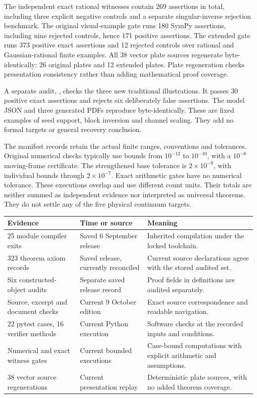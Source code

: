 The independent exact rational witnesses contain 269 assertions in total, including three explicit negative controls and a separate singular-inverse rejection benchmark. The original visual-example gate runs 180 SymPy assertions, including nine rejected controls, hence 171 positive assertions. The extended gate runs 373 positive exact assertions and 12 rejected controls over rational and Gaussian-rational finite examples. All 38 vector plate sources regenerate byte-identically: 26 original plates and 12 extended plates. Plate regeneration checks presentation consistency rather than adding mathematical proof coverage.

A separate audit, , checks the three new traditional illustrations. It passes 30 positive exact assertions and rejects six deliberately false assertions. The model JSON and three generated PDFs reproduce byte-identically. These are fixed examples of seed support, block inversion and channel scaling. They add no formal targets or general recovery conclusion.

The manifest records retain the actual finite ranges, conventions and tolerances. Original numerical checks typically use bounds from $10^{-12}$ to $10^{-10}$, with a $10^{-6}$ moving-frame certificate. The strengthened base tolerance is $2\times10^{-9}$, with individual bounds through $2\times10^{-7}$. Exact arithmetic gates have no numerical tolerance. These executions overlap and use different count units. Their totals are neither summed as independent evidence nor interpreted as universal theorems. They do not settle any of the five physical continuum targets.

\begin{longtable}{@{}p{.31\linewidth}p{.30\linewidth}p{.32\linewidth}@{}}
\toprule Evidence & Time or source & Meaning\\\midrule\endhead
25 module compiler exits & Saved 6 September release & Inherited compilation under the locked toolchain.\\
323 theorem axiom records & Saved release, currently reconciled & Current source declarations agree with the stored audited set.\\
Six constructed-object audits & Separate saved release record & Proof fields in definitions are audited separately.\\
Source, excerpt and document checks & Current 9 October edition & Exact source correspondence and readable navigation.\\
22 pytest cases, 16 verifier methods & Current Python execution & Software checks at the recorded inputs and conditions.\\
Numerical and exact witness gates & Current bounded executions & Case-bound computations with explicit arithmetic and assumptions.\\
38 vector source regenerations & Current presentation replay & Deterministic plate sources, with no added theorem coverage.\\
\bottomrule\end{longtable}


